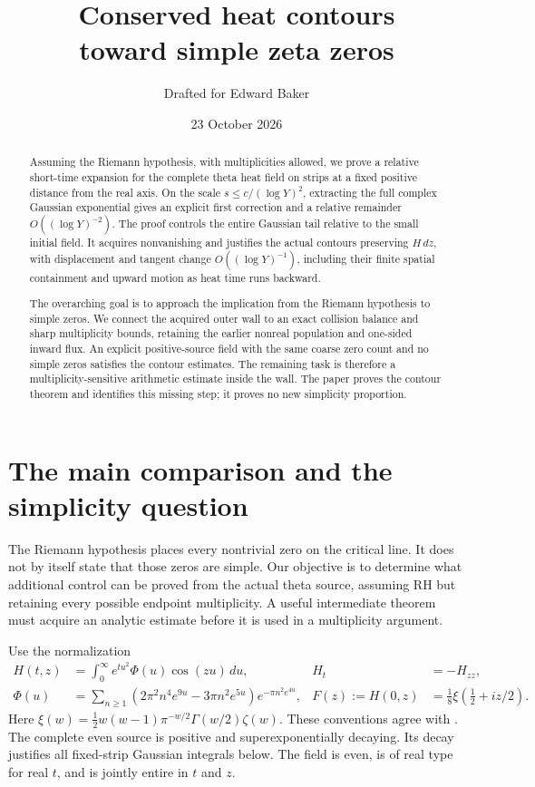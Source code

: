 \documentclass[11pt]{article}
\title{Conserved heat contours\\toward simple zeta zeros}
\author{Drafted for Edward Baker}
\date{23 October 2026}
\newcommand{\dd}{\,d}
\theoremstyle{remark}
\begin{document}
\maketitle

\begin{abstract}
Assuming the Riemann hypothesis, with multiplicities allowed, we prove
a relative short-time expansion for the complete theta heat field on
strips at a fixed positive distance from the real axis. On the scale
$s\le c/(\log Y)^2$, extracting the full complex Gaussian exponential
gives an explicit first correction and a relative remainder
$O((\log Y)^{-2})$. The proof controls the entire Gaussian tail relative
to the small initial field. It acquires nonvanishing and justifies the
actual contours preserving $H\,dz$, with displacement and tangent change
$O((\log Y)^{-1})$, including their finite spatial containment and upward
motion as heat time runs backward.

The overarching goal is to approach the implication from the Riemann
hypothesis to simple zeros. We connect the acquired outer wall to an
exact collision balance and sharp multiplicity bounds, retaining the
earlier nonreal population and one-sided inward flux. An explicit
positive-source field with the same coarse zero count and no simple
zeros satisfies the contour estimates. The remaining task is therefore
a multiplicity-sensitive arithmetic estimate inside the wall. The paper
proves the contour theorem and identifies this missing step; it proves
no new simplicity proportion.
\end{abstract}

\section{The main comparison and the simplicity question}
\label{sec:main}

The Riemann hypothesis places every nontrivial zero on the critical line.
It does not by itself state that those zeros are simple. Our objective is
to determine what additional control can be proved from the actual theta
source, assuming RH but retaining every possible endpoint multiplicity.
A useful intermediate theorem must acquire an analytic estimate before
it is used in a multiplicity argument.

Use the normalization
\begin{align}
 H(t,z)&=\int_0^\infty e^{tu^2}\Phi(u)\cos(zu)\dd u,
 &H_t&=-H_{zz},\label{eq:theta}\\
 \Phi(u)&=\sum_{n\ge1}
 (2\pi^2n^4e^{9u}-3\pi n^2e^{5u})e^{-\pi n^2e^{4u}},
 &F(z):=H(0,z)&=\tfrac18\xi(\tfrac12+iz/2).
 \label{eq:canonical}
\end{align}
Here $\xi(w)=\tfrac12w(w-1)\pi^{-w/2}\Gamma(w/2)\zeta(w)$.
These conventions agree with \cite{polymath,DLMF}. The complete even
source is positive and superexponentially decaying. Its decay justifies
all fixed-strip Gaussian integrals below. The field is even, is of real
type for real $t$, and is jointly entire in $t$ and $z$.
\end{document}

